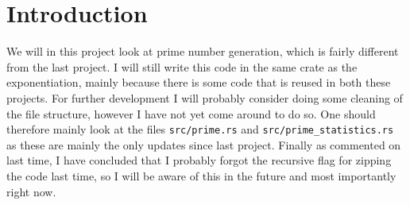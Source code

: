 \section{Introduction}

  We will in this project look at prime number generation, which is fairly different from the last project.
  I will still write this code in the same crate as the exponentiation, mainly because there is some code that is reused in both these projects. 
  For further development I will probably consider doing some cleaning of the file structure, however I have not yet come around to do so.
  One should therefore mainly look at the files \texttt{src/prime.rs} and \texttt{src/prime_statistics.rs} as these are mainly the only updates since last project.
  Finally as commented on last time, I have concluded that I probably forgot the recursive flag for zipping the code last time, so I will be aware of this in the future and most importantly right now.
